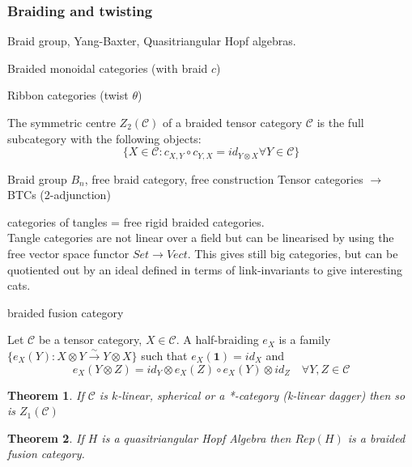 \documentclass{article}
\newtheorem{theorem}{Theorem}[section]
\newenvironment{definition}[1][Definition]{\begin{trivlist}
\item[\hskip \labelsep {\bfseries #1}]}{\end{trivlist}}
\newenvironment{example}[1][Example]{\begin{trivlist}
\item[\hskip \labelsep {\bfseries #1}]}{\end{trivlist}}
\begin{document}
\subsubsection{Braiding and twisting}
Braid group, Yang-Baxter, Quasitriangular Hopf algebras. \\
\begin{definition}
Braided monoidal categories (with braid $c$)
\end{definition}
\begin{definition}
Ribbon categories (twist $\theta$)
\end{definition}
\begin{definition}
The symmetric centre $Z_2(\mathcal{C})$ of a braided tensor category $\mathcal{C}$ is the full subcategory with the following objects:
$$ \{ X \in \mathcal{C} : c_{X,Y} \circ c_{Y,X} = id_{Y\otimes X} \forall Y \in \mathcal{C} \} $$
\end{definition}

\begin{example}
Braid group $B_n$, free braid category, free construction Tensor categories $\rightarrow$ BTCs (2-adjunction)
\end{example}
\begin{example}
categories of tangles = free rigid braided categories.\\
Tangle categories are not linear over a field but can be linearised by using the free vector space functor $Set \rightarrow Vect$. This gives still big categories, but can be quotiented out by an ideal defined in terms of link-invariants to give interesting cats.
\end{example}
\begin{definition}
braided fusion category
\end{definition}
\begin{definition}
Let $\mathcal{C}$ be a tensor category, $X \in \mathcal{C}$. A half-braiding $e_X$ is a family $\{ e_X(Y):X\otimes Y \xrightarrow{\sim} Y\otimes X \}$ such that $e_X(\mathbf{1}) = id_X$ and 
\begin{equation*}
e_X(Y\otimes Z) = id_Y\otimes e_X(Z) \circ e_X(Y) \otimes id_Z \quad \forall Y,Z \in \mathcal{C}
\end{equation*}
\end{definition}

\begin{theorem}
If $\mathcal{C}$ is $k$-linear, spherical or a *-category (k-linear dagger) then so is $Z_1(\mathcal{C})$ 
\end{theorem}
\begin{theorem}
If $H$ is a quasitriangular Hopf Algebra then $Rep(H)$ is a braided fusion category.
\end{theorem}
\end{document}
